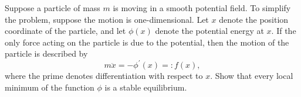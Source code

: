 \question[20]
%
Suppose a particle of mass $m$ is moving in a smooth potential field. To
simplify the problem, suppose the motion is one-dimensional. Let $x$ denote the
position coordinate of the particle, and let $\phi(x)$ denote the potential
energy at $x$. If the only force acting on the particle is due to the potential,
then the motion of the particle is described by \[ m \ddot{x} = -\phi^\prime(x)
=: f(x), \] where the prime denotes differentiation with respect to $x$. Show 
that every local minimum of the function $\phi$ is a stable equilibrium.